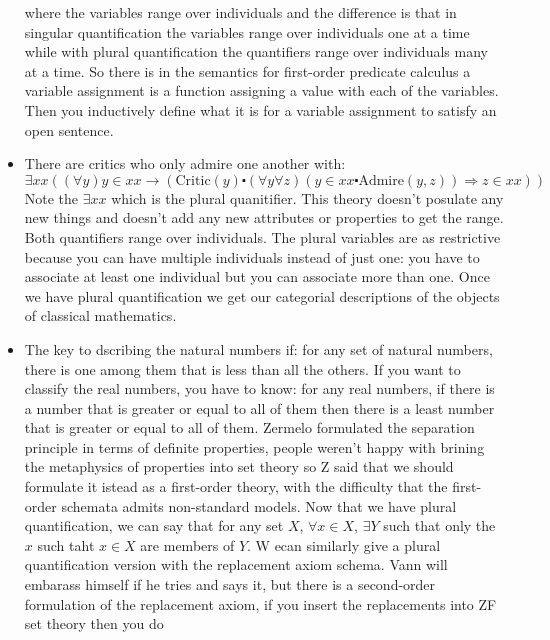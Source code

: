 \documentclass[12pt]{article}
\theoremstyle{definition}
\begin{document}
\begin{itemize}
        where the variables range over individuals and the difference is that
        in singular quantification the variables range over individuals one at
        a time while with plural quantification the quantifiers range over
        individuals many at a time. So there is in the semantics for
        first-order predicate calculus a variable assignment is a function
        assigning a value with each of the variables. Then you inductively
        define what it is for a variable assignment to satisfy an open
        sentence. 
    \item
        There are critics who only admire one another with: $$\exists xx
        ((\forall y)y \in xx \rightarrow (\mathrm{Critic}(y) \centerdot
        (\forall y \forall z) (y \in xx \centerdot \mathrm{Admire}(y, z))
        \Rightarrow z \in xx))$$ Note the $\exists xx$ which is the plural
        quanitifier. This theory doesn't posulate any new things and doesn't
        add any new attributes or properties to get the range. Both quantifiers
        range over individuals. The plural variables are as restrictive because
        you can have multiple individuals instead of just one: you have to
        associate at least one individual but you can associate more than one.
        Once we have plural quantification we get our categorial descriptions
        of the objects of classical mathematics. 
    \item
        The key to dscribing the natural numbers if: for any set of natural
        numbers, there is one among them that is less than all the others. If
        you want to classify the real numbers, you have to know: for any real
        numbers, if there is a number that is greater or equal to all of them
        then there is a least number that is greater or equal to all of them.
        Zermelo formulated the separation principle in terms of definite
        properties, people weren't happy with brining the metaphysics of
        properties into set theory so Z said that we should formulate it istead
        as a first-order theory, with the difficulty that the first-order
        schemata admits non-standard models. Now that we have plural
        quantification, we can say that for any set $X$, $\forall x \in X$,
        $\exists Y$ such that only the $x$ such taht $x \in X$ are members of
        $Y$. W ecan similarly give a plural quantification version with the
        replacement axiom schema. Vann will embarass himself if he tries and
        says it, but there is a second-order formulation of the replacement
        axiom, if you insert the replacements into ZF set theory then you do

\end{itemize}
\end{document}
